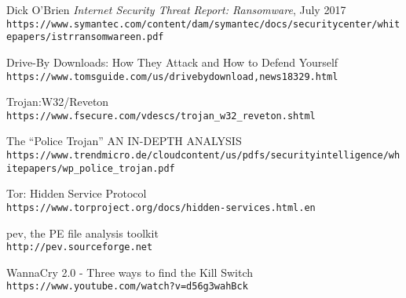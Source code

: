 \documentclass[10pt,a4paper]{article}
\begin{document}
\begin{thebibliography}{1}

Dick O’Brien
\textit{Internet Security Threat Report: Ransomware}, July 2017
\\\texttt{https://www.symantec.com/content/dam/symantec/docs/security\-center/white\-papers/istr\-ransomware\-en.pdf}

Drive-By Downloads: How They Attack and How to Defend Yourself
\\\texttt{https://www.tomsguide.com/us/driveby\-download,news\-18329.html}

Trojan:W32/Reveton
\\\texttt{https://www.f\-secure.com/v\-descs/trojan\_w32\_reveton.shtml}

The “Police Trojan”
AN IN-DEPTH ANALYSIS
\\\texttt{https://www.trendmicro.de/cloud\-content/us/pdfs/security\-intelligence/white\-papers/wp\_police\_trojan.pdf}

Tor: Hidden Service Protocol
\\\texttt{https://www.torproject.org/docs/hidden-services.html.en}

pev, the PE file analysis toolkit
\\\texttt{http://pev.sourceforge.net}

WannaCry 2.0 - Three ways to find the Kill Switch
\\\texttt{https://www.youtube.com/watch?v=d56g3wahBck}



\end{thebibliography}
\end{document}
